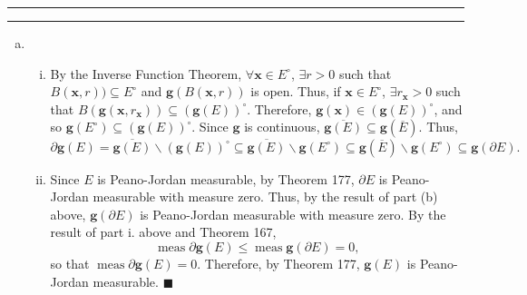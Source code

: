 \documentclass[11pt]{article}
\newcounter{questionCounter}
\newcounter{partCounter}[questionCounter]
\newenvironment{question}[2][\arabic{questionCounter}]{%
    \setcounter{partCounter}{0}%
    \vspace{.25in} \hrule \vspace{0.5em}%
        \noindent{\bf #2}%
    \vspace{0.8em} \hrule \vspace{.10in}%
    \addtocounter{questionCounter}{1}%
}{}
\begin{document}
\begin{question}{Problem 4}
\begin{enumerate}[(a)]
\item
\begin{enumerate}[i.]
\item By the Inverse Function Theorem, $\forall \mathbf{x} \in E^{\circ}$,
$\exists r > 0$ such that $B(\mathbf{x},r)) \subseteq E^{\circ}$ and
$\mathbf{g}(B(\mathbf{x},r))$ is open. Thus, if $\mathbf{x} \in E^{\circ}$,
$\exists r_{\mathbf{x}} > 0$ such that $B(\mathbf{g}(\mathbf{x},r_\mathbf{x}))
 \subseteq \left(\mathbf{g}(E)\right)^{\circ}$. Therefore,
$\mathbf{g}(\mathbf{x}) \in \left(\mathbf{g}(E)\right)^{\circ}$, and so
$\mathbf{g}(E^{\circ}) \subseteq \left(\mathbf{g}(E)\right)^{\circ}$.
Since $\mathbf{g}$ is continuous,
$\overline{\mathbf{g}(E)} \subseteq \mathbf{g}(\overline{E})$.
Thus,
\[\partial\mathbf{g}(E)
 = \overline{\mathbf{g}(E)}\backslash (\mathbf{g}(E))^{\circ}
 \subseteq \overline{\mathbf{g}(E)}\backslash \mathbf{g}(E^{\circ})
 \subseteq \mathbf{g}(\overline{E})\backslash \mathbf{g}(E^{\circ})
 \subseteq \mathbf{g}(\partial E).\]

\item Since $E$ is Peano-Jordan measurable, by Theorem 177, $\partial E$ is
Peano-Jordan measurable with measure zero. Thus, by the result of part (b)
above, $\mathbf{g}(\partial E)$ is Peano-Jordan measurable with measure zero.
By the result of part i. above and Theorem 167,
\[\operatorname{meas} \partial \mathbf{g}(E)
  \leq \operatorname{meas} \mathbf{g}(\partial E) = 0,\]
so that $\operatorname{meas} \partial \mathbf{g}(E) = 0$. Therefore, by
Theorem 177, $\mathbf{g}(E)$ is Peano-Jordan measurable. \quad $\blacksquare$
\end{enumerate}
\end{enumerate}
\end{question}
\end{document}

